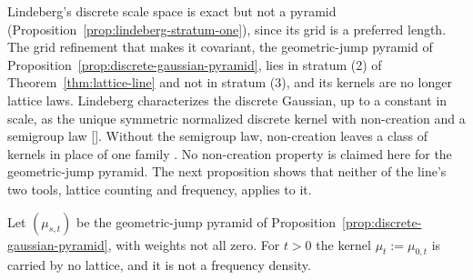 Lindeberg's discrete scale space is exact but not a pyramid
(Proposition~\ref{prop:lindeberg-stratum-one}), since its grid is a preferred length. The grid
refinement that makes it covariant, the geometric-jump pyramid of
Proposition~\ref{prop:discrete-gaussian-pyramid}, lies in stratum (2) of
Theorem~\ref{thm:lattice-line} and not in stratum (3), and its kernels are no longer lattice laws.
Lindeberg characterizes the discrete Gaussian, up to a constant in scale, as the unique
symmetric normalized discrete kernel with non-creation and a semigroup law
[]. Without the semigroup law, non-creation leaves a
class of kernels in place of one family . No non-creation
property is claimed here for the geometric-jump pyramid. The next proposition shows that neither
of the line's two tools, lattice counting and \Polya{} frequency, applies to it.

\begin{proposition}
\label{prop:classical-pyramids-approximate-discrete-gaussian}

Let $(\mu_{s,t})$ be the geometric-jump pyramid of Proposition~\ref{prop:discrete-gaussian-pyramid},
with weights not all zero. For $t > 0$ the kernel $\mu_t := \mu_{0,t}$ is carried by no lattice, and
it is not a \Polya{} frequency density.
\end{proposition}

